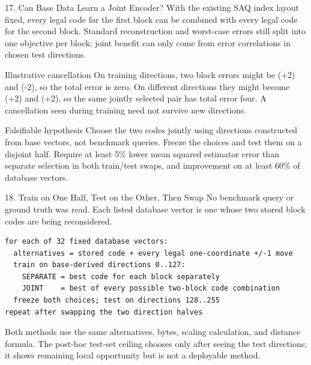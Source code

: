 \documentclass[aspectratio=169]{beamer}
\begin{document}
\begin{frame}{17. Can Base Data Learn a Joint Encoder?}
\small
With the existing SAQ index layout fixed, every legal code for the first block
can be combined with every legal code for the second block. Standard
reconstruction and worst-case errors still split into one objective per block;
joint benefit can only come from error correlations in chosen test directions.
\begin{block}{Illustrative cancellation}
On training directions, two block errors might be (+2) and (-2), so the
total error is zero.  On different directions they might become (+2) and
(+2), so the same jointly selected pair has total error four.  A cancellation
seen during training need not survive new directions.
\end{block}
\begin{alertblock}{Falsifiable hypothesis}
Choose the two codes jointly using directions constructed from base vectors,
not benchmark queries. Freeze the choices and test them on a disjoint half.
Require at least 5\% lower mean squared estimator error than separate selection
in both train/test swaps, and improvement on at least 60\% of database vectors.
\end{alertblock}
\end{frame}

\begin{frame}[fragile]{18. Train on One Half, Test on the Other, Then Swap}
\small
No benchmark query or ground truth was read. Each listed database vector is
one whose two stored block codes are being reconsidered.
\begin{verbatim}
for each of 32 fixed database vectors:
  alternatives = stored code + every legal one-coordinate +/-1 move
  train on base-derived directions 0..127:
    SEPARATE = best code for each block separately
    JOINT    = best of every possible two-block code combination
  freeze both choices; test on directions 128..255
repeat after swapping the two direction halves
\end{verbatim}
Both methods use the same alternatives, bytes, scaling calculation, and
distance formula.
The post-hoc test-set ceiling chooses only after seeing the test directions;
it shows remaining local opportunity but is not a deployable method.
\end{frame}
\end{document}
